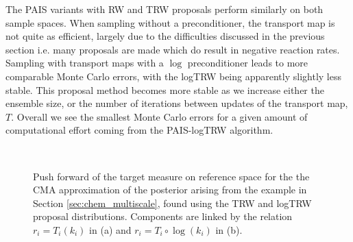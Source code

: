 \documentclass[final]{siamltex}
\begin{document}
The PAIS variants with RW and TRW proposals perform similarly on both
sample spaces. When sampling without a preconditioner, the transport map is not
quite as efficient, largely due to the difficulties discussed in the
previous section i.e. many proposals are made which do result in
negative reaction rates. Sampling with transport maps with a $\log$ preconditioner leads to more comparable Monte Carlo errors, with the logTRW being apparently slightly less stable. This proposal method becomes more stable as we increase either the ensemble size, or the number of iterations between updates of the transport map, $T$. Overall we see the smallest Monte Carlo errors for a given amount of computational effort coming from the PAIS-logTRW algorithm.

\begin{figure}[!htb]
\centering
{}
\\
\caption{Push forward of the target measure on reference space for the the CMA
  approximation of the  posterior arising from the example in Section \ref{sec:chem_multiscale}, found using the TRW and logTRW proposal distributions. Components are linked by the relation $r_i = T_i(k_i)$ in (a) and $r_i = T_i\circ\log(k_i)$ in (b).}
\label{fig:chem_reference_spaces}
\end{figure}
\end{document}
